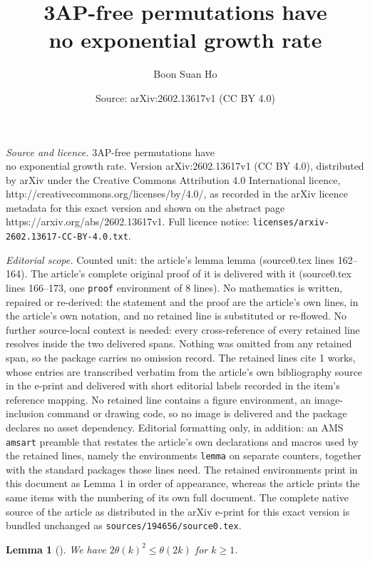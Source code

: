 \documentclass[10pt,a4paper]{amsart}
\title{3AP-free permutations have \\ no exponential growth rate}
\author{Boon Suan Ho}
\date{Source: arXiv:2602.13617v1 (CC BY 4.0)}
\newtheorem{lemma}{Lemma}
\begin{document}
\maketitle

\noindent\emph{Source and licence.} 3AP-free permutations have \\ no exponential growth rate. Version arXiv:2602.13617v1 (CC BY 4.0), distributed by arXiv under the Creative Commons Attribution 4.0 International licence, http://creativecommons.org/licenses/by/4.0/, as recorded in the arXiv licence metadata for this exact version and shown on the abstract page https://arxiv.org/abs/2602.13617v1. Full licence notice: \texttt{licenses/arxiv-2602.13617-CC-BY-4.0.txt}.\par\smallskip

\noindent\textit{Editorial scope.} Counted unit: the article's lemma lemma (source0.tex lines 162--164). The article's complete original proof of it is delivered with it (source0.tex lines 166--173, one \texttt{proof} environment of 8 lines). No mathematics is written, repaired or re-derived: the statement and the proof are the article's own lines, in the article's own notation, and no retained line is substituted or re-flowed.  No further source-local context is needed: every cross-reference of every retained line resolves inside the two delivered spans.  Nothing was omitted from any retained span, so the package carries no omission record.  The retained lines cite 1 works, whose entries are transcribed verbatim from the article's own bibliography source in the e-print and delivered with short editorial labels recorded in the item's reference mapping.  No retained line contains a figure environment, an image-inclusion command or drawing code, so no image is delivered and the package declares no asset dependency.  Editorial formatting only, in addition: an AMS \texttt{amsart} preamble that restates the article's own declarations and macros used by the retained lines, namely the environments \texttt{lemma} on separate counters, together with the standard packages those lines need.  The retained environments print in this document as Lemma 1 in order of appearance, whereas the article prints the same items with the numbering of its own full document.  The complete native source of the article as distributed in the arXiv e-print for this exact version is bundled unchanged as \texttt{sources/194656/source0.tex}.
\begin{lemma}[\cite{DEGS77}]
We have $2\theta(k)^2\le\theta(2k)$ for $k\ge1$.
\end{lemma}
\end{document}
